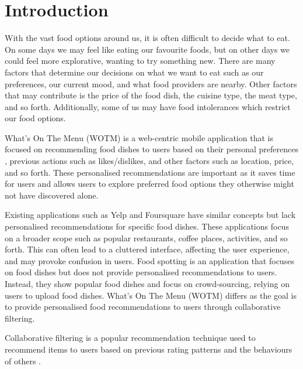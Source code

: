 \chapter{Introduction}\label{C:intro}

With the vast food options around us, it is often difficult to decide what to eat. On some days we may feel like eating our favourite foods, but on other days we could feel more explorative, wanting to try something new. There are many factors that determine our decisions on what we want to eat such as our preferences, our current mood, and what food providers are nearby. Other factors that may contribute is the price of the food dish, the cuisine type, the meat type, and so forth. Additionally, some of us may have food intolerances which restrict our food options.

What’s On The Menu (WOTM) is a web-centric mobile application that is focused on recommending food dishes to users based on their personal preferences , previous actions such as likes/dislikes, and other factors such as location, price, and so forth. These personalised recommendations are important as it saves time for users and allows users to explore preferred food options they otherwise might not have discovered alone. 

Existing applications such as Yelp and Foursquare have similar concepts but lack personalised recommendations for specific food dishes. These applications focus on a broader scope such as popular restaurants, coffee places, activities, and so forth. This can often lead to a cluttered interface, affecting the user experience, and may provoke confusion in users. Food spotting is an application that focuses on food dishes but does not provide personalised recommendations to users. Instead, they show popular food dishes and focus on crowd-sourcing, relying on users to upload food dishes. What's On The Menu (WOTM) differs as the goal is to provide personalised food recommendations to users through collaborative filtering. 

Collaborative filtering is a popular recommendation technique used to recommend items to users based on previous rating patterns and the behaviours of others \cite{itembased, schafer2007collaborative, survey}. 

